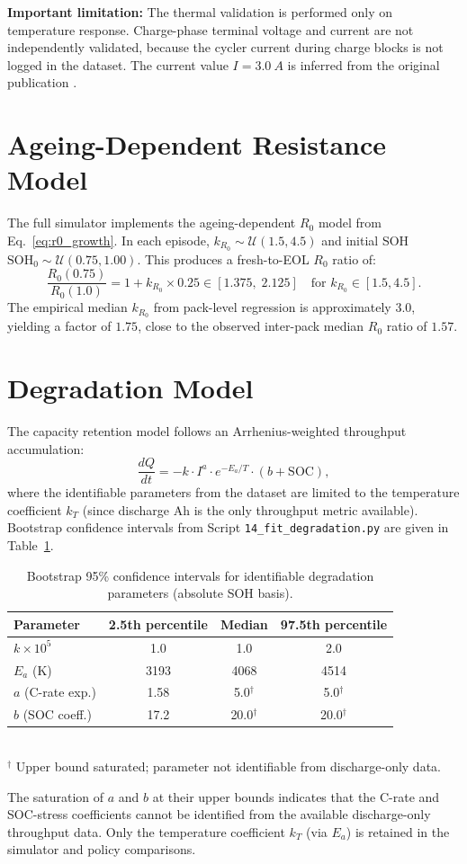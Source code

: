 \textbf{Important limitation:} The thermal validation is performed
only on temperature response.  Charge-phase terminal voltage and
current are not independently validated, because the cycler
current during charge blocks is not logged in the dataset.  The
current value $I = \SI{3.0}{A}$ is inferred from the original
publication \cite{fricke2023nasa}.

\section{Ageing-Dependent Resistance Model}

The full simulator implements the ageing-dependent $R_0$ model from
Eq.~\ref{eq:r0_growth}.  In each episode, $k_{R_0} \sim \mathcal{U}(1.5, 4.5)$
and initial SOH $\mathrm{SOH}_0 \sim \mathcal{U}(0.75, 1.00)$.
This produces a fresh-to-EOL $R_0$ ratio of:
\begin{equation}
  \frac{R_0(0.75)}{R_0(1.0)} = 1 + k_{R_0} \times 0.25
  \in [1.375,\; 2.125] \quad \text{for } k_{R_0} \in [1.5, 4.5].
\end{equation}
The empirical median $k_{R_0}$ from pack-level regression is
approximately 3.0, yielding a factor of $1.75$, close to the
observed inter-pack median $R_0$ ratio of $1.57$.

\section{Degradation Model}

The capacity retention model follows an Arrhenius-weighted throughput
accumulation:
\begin{equation}
  \frac{dQ}{dt} = -k \cdot I^a \cdot e^{-E_a / T} \cdot (b + \mathrm{SOC}),
  \label{eq:degradation}
\end{equation}
where the identifiable parameters from the dataset are limited to the
temperature coefficient $k_T$ (since discharge Ah is the only
throughput metric available).  Bootstrap confidence intervals from
Script \texttt{14\_fit\_degradation.py} are given in
Table~\ref{tab:degradation_ci}.

\begin{table}[htbp]
  \centering
  \caption{Bootstrap 95\% confidence intervals for identifiable
  degradation parameters (absolute SOH basis).}
  \label{tab:degradation_ci}
  \begin{tabular}{lccc}
    \toprule
    \textbf{Parameter} & \textbf{2.5th percentile} &
    \textbf{Median} & \textbf{97.5th percentile} \\
    \midrule
    $k \times 10^5$   & 1.0  & 1.0  & 2.0  \\
    $E_a$ (K)         & 3193 & 4068 & 4514 \\
    $a$ (C-rate exp.) & 1.58 & 5.0$^\dagger$ & 5.0$^\dagger$ \\
    $b$ (SOC coeff.)  & 17.2 & 20.0$^\dagger$ & 20.0$^\dagger$ \\
    \bottomrule
  \end{tabular}
  \\\vspace{4pt}\small
  $^\dagger$ Upper bound saturated; parameter not identifiable from
  discharge-only data.
\end{table}

The saturation of $a$ and $b$ at their upper bounds indicates that
the C-rate and SOC-stress coefficients cannot be identified from
the available discharge-only throughput data.  Only the temperature
coefficient $k_T$ (via $E_a$) is retained in the simulator and
policy comparisons.
